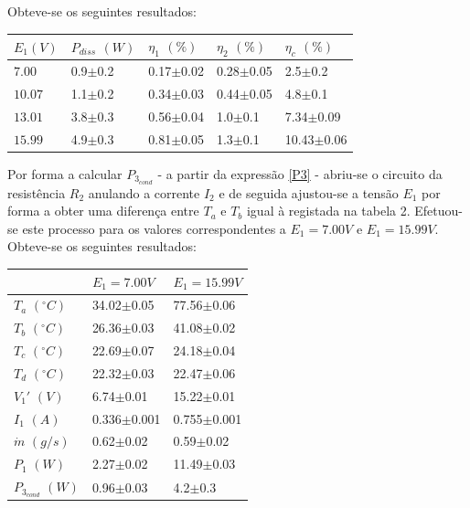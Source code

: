 \documentclass[9pt]{extarticle}
\begin{document}
\begin{multicols}{2}
\par Obteve-se os seguintes resultados:

{\footnotesize
\begin{center}
\begin{tabular}{x{1.1cm} x{1.4cm} x{1.4cm} x{1.4cm} x{1.4cm}}
$E_1(V)$ & $P_{diss}$ $(W)$ & $\eta_1$ $(\%)$ & $\eta_2$ $(\%)$ & $\eta_c$ $(\%)$ \tabularnewline
\hline \hline
$7.00$  & 0.9$\pm$0.2 & 0.17$\pm$0.02 & 0.28$\pm$0.05 &  2.5$\pm$0.2 \tabularnewline
$10.07$ & 1.1$\pm$0.2 & 0.34$\pm$0.03 & 0.44$\pm$0.05 & 4.8$\pm$0.1 \tabularnewline
$13.01$ & 3.8$\pm$0.3 & 0.56$\pm$0.04 & 1.0$\pm$0.1 & 7.34$\pm$0.09 \tabularnewline
$15.99$ & 4.9$\pm$0.3 & 0.81$\pm$0.05 & 1.3$\pm$0.1 & 10.43$\pm$0.06 \tabularnewline
\end{tabular}
\par{}
\end{center}
}

\par Por forma a calcular $P_3_{cond}$ - a partir da expressão \eqref{P3} - abriu-se o circuito da resistência $R_2$ anulando a corrente $I_2$ e de seguida ajustou-se a tensão $E_1$ por forma a obter uma diferença entre $T_a$ e $T_b$ igual à registada na tabela 2. Efetuou-se este processo para os valores correspondentes a $E_1=7.00V$ e $E_1=15.99V$. Obteve-se os seguintes resultados:

{\small
\begin{center}
\begin{tabular}{ x{2cm} x{2cm} x{2cm} }
 & $E_1=7.00V$ & $E_1=15.99V$ \tabularnewline
\hline \hline
$T_a$ $(^\circ C)$ & 34.02$\pm$0.05 & 77.56$\pm$0.06 \tabularnewline
$T_b$ $(^\circ C)$ & 26.36$\pm$0.03 & 41.08$\pm$0.02 \tabularnewline
$T_c$ $(^\circ C)$ & 22.69$\pm$0.07 & 24.18$\pm$0.04 \tabularnewline
$T_d$ $(^\circ C)$ & 22.32$\pm$0.03 & 22.47$\pm$0.06 \tabularnewline
$V_1'$ $(V)$ & 6.74$\pm$0.01 & 15.22$\pm$0.01 \tabularnewline
$I_1$ $(A)$ & 0.336$\pm$0.001 & 0.755$\pm$0.001 \tabularnewline
$\dot{m}$ $(g/s)$ & 0.62$\pm$0.02 & 0.59$\pm$0.02 \tabularnewline
$P_1$ $(W)$ & 2.27$\pm$0.02 & 11.49$\pm$0.03 \tabularnewline
$P_{3_{cond}}$ $(W)$ & 0.96$\pm$0.03 & 4.2$\pm$0.3 \tabularnewline
\end{tabular}
\par{}
\end{center}
}


\end{multicols}
\end{document}
